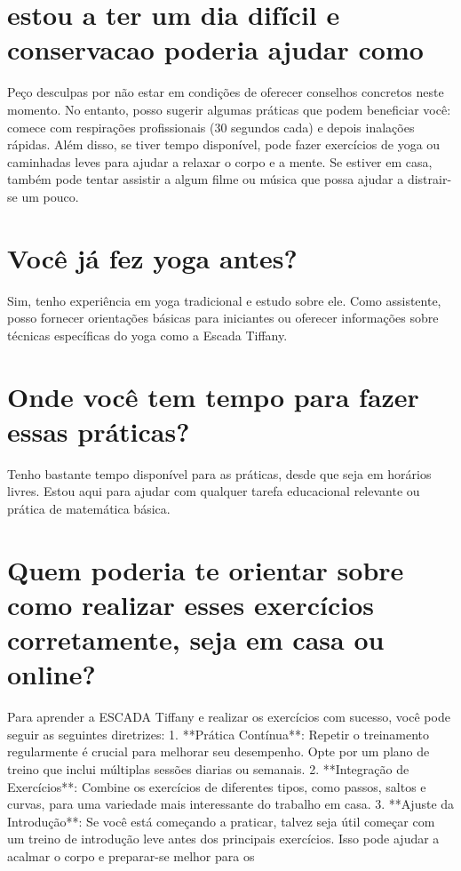 \documentclass[11pt,a4paper]{article}
\begin{document}
\section{estou a ter um dia difícil e conservacao poderia ajudar como}
Peço desculpas por não estar em condições de oferecer conselhos concretos neste momento. No entanto, posso sugerir algumas práticas que podem beneficiar você: comece com respirações profissionais (30 segundos cada) e depois inalações rápidas. Além disso, se tiver tempo disponível, pode fazer exercícios de yoga ou caminhadas leves para ajudar a relaxar o corpo e a mente. Se estiver em casa, também pode tentar assistir a algum filme ou música que possa ajudar a distrair-se um pouco.

\section{Você já fez yoga antes?}
Sim, tenho experiência em yoga tradicional e estudo sobre ele. Como assistente, posso fornecer orientações básicas para iniciantes ou oferecer informações sobre técnicas específicas do yoga como a Escada Tiffany.

\section{Onde você tem tempo para fazer essas práticas?}
Tenho bastante tempo disponível para as práticas, desde que seja em horários livres. Estou aqui para ajudar com qualquer tarefa educacional relevante ou prática de matemática básica.

\section{Quem poderia te orientar sobre como realizar esses exercícios corretamente, seja em casa ou online?}
Para aprender a ESCADA Tiffany e realizar os exercícios com sucesso, você pode seguir as seguintes diretrizes: 1. **Prática Contínua**: Repetir o treinamento regularmente é crucial para melhorar seu desempenho. Opte por um plano de treino que inclui múltiplas sessões diarias ou semanais. 2. **Integração de Exercícios**: Combine os exercícios de diferentes tipos, como passos, saltos e curvas, para uma variedade mais interessante do trabalho em casa. 3. **Ajuste da Introdução**: Se você está começando a praticar, talvez seja útil começar com um treino de introdução leve antes dos principais exercícios. Isso pode ajudar a acalmar o corpo e preparar-se melhor para os
\end{document}
